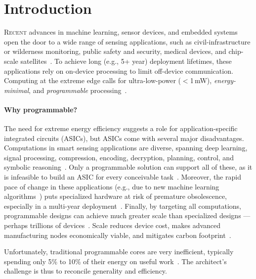 \section{Introduction}
\label{riptide:intro}

\lettrine{R}{ecent} advances in machine learning,
sensor devices, and
embedded systems open the door
to a wide range of sensing applications,
such as
civil-infrastructure or wilderness monitoring,
public safety and security,
medical devices,
and chip-scale satellites~\cite{kicksat2}.
%
To achieve long (e.g., 5+ year) deployment lifetimes,
these applications rely on on-device processing
to limit off-device communication.
%
Computing at the extreme edge
calls for ultra-low-power ($<$1\,mW),
\emph{energy-minimal},
and \emph{programmable} processing~\cite{sonic}.

\paragraph{Why programmable?} 
\label{intro:programmability}
The need for extreme energy efficiency suggests a role for
application-specific integrated circuits (ASICs), but ASICs
come with several major disadvantages.
%
Computations in smart sensing applications are diverse, spanning deep
learning, signal processing, compression, encoding, decryption,
planning, control, and symbolic reasoning~\cite{Gobieski2018IntermittentDN}.
%
Only a programmable solution can support all of these, as it is
infeasible to build an ASIC for every conceivable task~\cite{edge-offload,moonwalk}.
%
Moreover, the rapid pace of change in these applications (e.g., due to
new machine learning algorithms~\cite{jouppi2021ten})
puts specialized hardware at risk of premature obsolescence, especially in
a multi-year deployment~\cite{edge-offload}.
%
Finally, by targeting all computations, programmable designs
can achieve much greater scale than specialized designs --- perhaps trillions of devices~\cite{arm-trillions}.
Scale reduces device cost,
makes advanced manufacturing nodes economically viable,
and mitigates carbon footprint~\cite{gupta2022chasing}.

Unfortunately, traditional programmable cores are very inefficient,
typically spending only 5\% to 10\% of their energy on useful work~\cite{manic,snafu,horowitz:isscc14:energy-keynote}.
%
The architect's challenge is thus to reconcile generality and efficiency.

\figRipTideIntro


